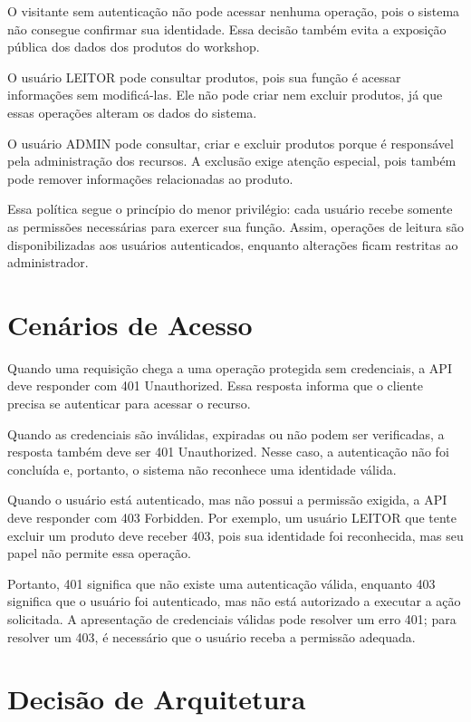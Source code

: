 \documentclass[12pt,a4paper]{article}
\begin{document}
O visitante sem autenticação não pode acessar nenhuma operação, pois o sistema não consegue confirmar sua identidade. Essa decisão também evita a exposição pública dos dados dos produtos do workshop.

O usuário LEITOR pode consultar produtos, pois sua função é acessar informações sem modificá-las. Ele não pode criar nem excluir produtos, já que essas operações alteram os dados do sistema.

O usuário ADMIN pode consultar, criar e excluir produtos porque é responsável pela administração dos recursos. A exclusão exige atenção especial, pois também pode remover informações relacionadas ao produto.

Essa política segue o princípio do menor privilégio: cada usuário recebe somente as permissões necessárias para exercer sua função. Assim, operações de leitura são disponibilizadas aos usuários autenticados, enquanto alterações ficam restritas ao administrador.

\section{Cenários de Acesso}
Quando uma requisição chega a uma operação protegida sem credenciais, a API deve responder com 401 Unauthorized. Essa resposta informa que o cliente precisa se autenticar para acessar o recurso.

Quando as credenciais são inválidas, expiradas ou não podem ser verificadas, a resposta também deve ser 401 Unauthorized. Nesse caso, a autenticação não foi concluída e, portanto, o sistema não reconhece uma identidade válida.

Quando o usuário está autenticado, mas não possui a permissão exigida, a API deve responder com 403 Forbidden. Por exemplo, um usuário LEITOR que tente excluir um produto deve receber 403, pois sua identidade foi reconhecida, mas seu papel não permite essa operação.

Portanto, 401 significa que não existe uma autenticação válida, enquanto 403 significa que o usuário foi autenticado, mas não está autorizado a executar a ação solicitada. A apresentação de credenciais válidas pode resolver um erro 401; para resolver um 403, é necessário que o usuário receba a permissão adequada.

\section{Decisão de Arquitetura}
\end{document}
